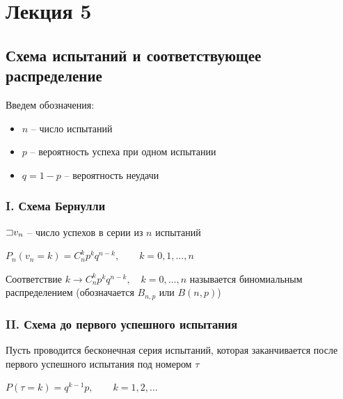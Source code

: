 \documentclass[12pt]{article}
\begin{document}
    \section{Лекция 5}

    \subsection{Схема испытаний и соответствующее распределение}

    Введем обозначения:

    \begin{itemize}
        \item $n$ -- число испытаний

        \item $p$ -- вероятность успеха при одном испытании

        \item $q = 1 - p$ -- вероятность неудачи
    \end{itemize}

    \hypertarget{bernoullischema2}{}

    \subsubsection{I. Схема Бернулли}

    $\mathord{\sqsupset} v_n$ -- число успехов в серии из $n$ испытаний

    $P_n(v_n = k) = C^k_n p^k q^{n - k}, \quad\quad k = 0, 1, \dots, n$

    \hypertarget{binomialdistribution}{}

    \Def Соответствие $k \rightarrow C^k_n p^k q^{n - k}, \quad k = 0, \dots, n$ называется биномиальным распределением
    (обозначается $B_{n,p}$ или $B(n, p)$)

    \hypertarget{untilfirstsuccessschema}{}

    \subsubsection{II. Схема до первого успешного испытания}

    Пусть проводится бесконечная серия испытаний, которая заканчивается после первого успешного испытания
    под номером $\tau$

    \begin{MyTheorem}
        \Ths $P(\tau = k) = q^{k - 1} p, \quad\quad k = 1, 2, \dots$
    \end{MyTheorem}
\end{document}
